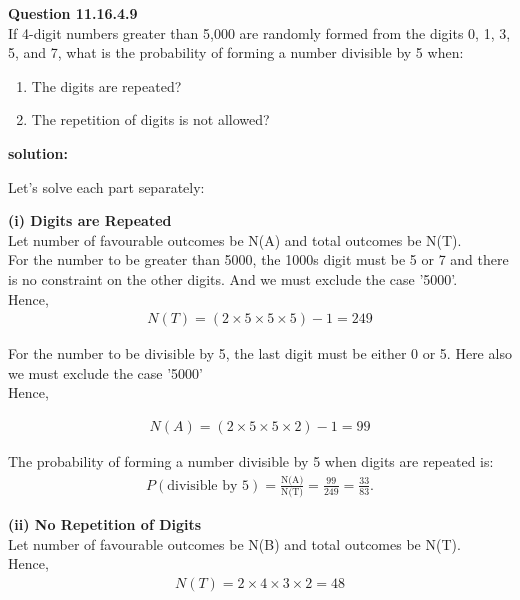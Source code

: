 \documentclass{article}
\begin{document}
\providecommand{\pr}[1]{\ensuremath{\Pr\left(#1\right)}}
\providecommand{\brak}[1]{\ensuremath{\left(#1\right)}}
\newcommand{\solution}{\noindent \textbf{solution: }}

\textbf{Question 11.16.4.9}\\
If 4-digit numbers greater than 5,000 are randomly formed from the digits 0, 1, 3, 5, and 7, what is the probability of forming a number divisible by 5 when:
\begin{enumerate}
    \item The digits are repeated?
    \item The repetition of digits is not allowed?
\end{enumerate}

\solution

Let's solve each part separately:

\textbf{(i) Digits are Repeated}\\
Let number of favourable outcomes be N(A) and total outcomes be N(T). \\
For the number to be greater than  5000, the 1000s digit must be 5 or 7 and there is no constraint on the other digits. And we must exclude the case '5000'.\\
Hence,
\begin{align}
	N(T)= (2 \times 5 \times 5 \times 5)-1=249
\end{align}

For the number to be divisible by 5, the last digit must be either 0 or 5.  Here also we must exclude the case '5000'\\
Hence,

\begin{align}
	N(A)= (2 \times 5 \times 5 \times 2)-1=99
\end{align}

The probability of forming a number divisible by 5 when digits are repeated is:
\begin{align}
P(\text{divisible by 5}) = \frac{\text{N(A)}}{\text{N(T)}} = \frac{99}{249} = \frac{33}{83}.
\end{align}


\textbf{(ii) No Repetition of Digits}\\
Let number of favourable outcomes be N(B) and total outcomes be N(T). \\
Hence,
\begin{align}
	N(T)= 2 \times 4 \times 3 \times 2=48
\end{align}
\end{document}
